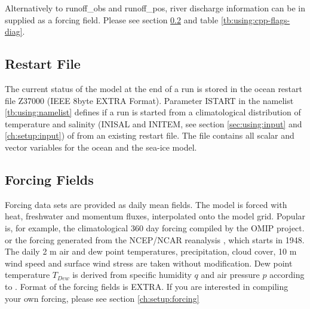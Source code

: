 Alternatively to runoff\_obs and runoff\_pos, river discharge information can
be in supplied as a forcing field.
Please see section \ref{sec:using:forcing} and table \ref{tb:using:cpp-flags-diag}.


\subsection{Restart File}

The current status of the model at the end of a run is stored in the ocean restart file 
Z37000 (IEEE 8byte EXTRA Format). Parameter ISTART in the namelist \ref{tb:using:namelist} defines if a run is 
started from a climatological distribution of temperature and salinity (INISAL and INITEM, see section 
\ref{sec:using:input} and \ref{ch:setup:input})
of from an existing restart file. 
The file contains all scalar and vector variables for the ocean and the sea-ice model.


\subsection{Forcing Fields}
\label{sec:using:forcing}

Forcing data sets are provided as daily mean fields.
The model is forced with heat, freshwater and momentum fluxes, 
interpolated onto the model grid. Popular is, for example, 
the climatological 360 day forcing compiled by the OMIP project. 
or the forcing generated from the NCEP/NCAR reanalysis \citep{kalnay96}, which starts in 1948.
The daily 2 m air and dew point temperatures,
precipitation, cloud cover, 10 m wind
speed and surface wind stress are taken without modification.
Dew point temperature $T_{Dew}$ is derived from specific humidity $q$ and air
pressure $p$ according to \citet{oberhuber88}. Format of the forcing fields is EXTRA.
If you are interested in compiling your own forcing, please see section \ref{ch:setup:forcing}



